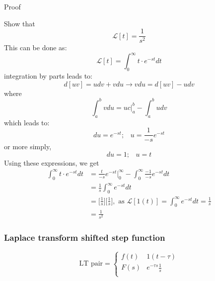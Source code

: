 \documentclass[12pt,letter]{article}
\numberwithin{ex}{section} %
\numberwithin{re}{section} %
\newcommand{\gr}[1]{\textcolor[rgb]{0.00,0.50,0.00}{#1}}
\newcommand{\Laplace}[1]{\ensuremath{\mathcal{L}{\left[#1\right]}}}
\numberwithin{equation}{section}	%
\begin{document}
\begin{mdframed}[middlelinewidth=0.5mm]
\begin{center}
\gr{Proof}
\end{center}
Show that
\begin{equation}
\Laplace{t} = \frac{1}{s^2}
\end{equation}
This can be done as:
\begin{equation}
\Laplace{t} =  \int_{0}^{\infty}t \cdot e^{-st} dt
\end{equation}
integration by parts leads to:
\begin{equation}
d[uv] = udv + vdu \rightarrow vdu = d[uv] - udv
\end{equation}
where
\begin{equation}
 \int_{a}^{b} vdu = uc \bigg|_a^b - \int_{a}^{b} u dv
\end{equation}
which leads to:
\begin{equation}
du = e^{-st};  \; \; \; u = \frac{1}{-s}e^{-st}
\end{equation}
or more simply, 
\begin{equation}
du = 1;  \; \; \; u = t
\end{equation}
Using these expressions, we get
\begin{align}
	 \int_{0}^{\infty}t \cdot e^{-st} dt &=  \frac{t}{-s} e^{-s t} \bigg|_0^\infty - \int_{0}^{\infty}\frac{-1}{-s}e^{-st} dt \\ \nonumber
	&= \frac{1}{s} \int_{0}^{\infty} e^{-st} dt \\ \nonumber
&= \bigg[\frac{1}{s}\bigg]\bigg[\frac{1}{s}\bigg],\text{ as }  \Laplace{1(t)} =  \int_{0}^{\infty} e^{-st} dt  = \frac{1}{s} \\ \nonumber
&= \frac{1}{s^2}
\end{align}
\end{mdframed}


		\subsubsection{Laplace transform shifted step function}

		\begin{equation}
		\text{LT pair} =
			\begin{cases}
			f(t) & 1(t-\tau) \\
			F(s) & e^{-\tau s} \frac{1}{s} \\
			\end{cases}
		\end{equation}
\end{document}
